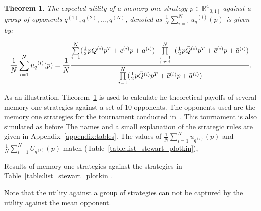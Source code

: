 \documentclass[10pt]{article}
\newtheorem{theorem}{Theorem}
\begin{document}
\begin{theorem}\label{theorem:tournament_utility}
    The expected utility of a memory one strategy \(p\in\mathbb{R}_{[0,1]}^4\)
    against a group of opponents \(q^{(1)}, q^{(2)}, \dots, q^{(N)}\), denoted
    as \(\frac{1}{N} \sum\limits_{i=1} ^ {N} {u_q}^{(i)} (p)\) is given by:

    \begin{equation}\label{eq:tournament_utility}
        \frac{1}{N} \sum\limits_{i=1} ^ {N} {u_q}^{(i)} (p) = \frac{1}{N}
        \frac{\sum\limits_{i=1} ^ {N} (\frac{1}{2} pQ^{(i)} p^T + c^{(i)} p + a^ {(i)})
        \prod\limits_{\tiny\begin{array}{l} j=1 \\ j \neq i \end{array}} ^
        N (\frac{1}{2} p\bar{Q}^{(i)} p^T + \bar{c}^{(i)} p + \bar{a}^ {(i)})}
        {\prod\limits_{i=1} ^ N (\frac{1}{2} p\bar{Q}^{(i)} p^T + \bar{c}^{(i)} p + \bar{a}^ {(i)})}.
    \end{equation}
\end{theorem}

As an illustration, Theorem~\ref{theorem:tournament_utility} is used to calculate
he theoretical payoffs of several memory one strategies against
a set of 10 opponents. The opponents used are the memory one strategies for the
tournament
conducted in~\cite{Stewart2012}. This tournament is also simulated as before
The names and a small explanation of the strategic rules are
given in Appendix~\ref{appendix:tables}.
The values of \(\frac{1}{N} \sum\limits_{i=1} ^ {N} u_{q ^{(i)}} (p)\) and
\(\frac{1}{N} \sum\limits_{i=1} ^ {N} U_{q ^{(i)}} (p)\) match (Table~\ref{table:list_stewart_plotkin}),

\begin{table}[htbp]
    \begin{center}
    
    \end{center}
    \caption{Results of memory one strategies against the strategies in Table~\ref{table:list_stewart_plotkin}.}
    \label{table:list_stewart_plotkin}
\end{table}


Note that the utility against a group of strategies can not be captured by
the utility against the mean opponent.
\end{document}

